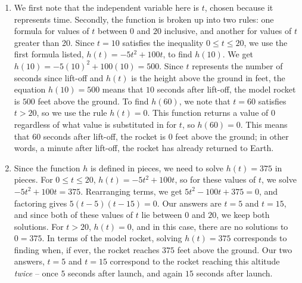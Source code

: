 {
\begin{enumerate} \item We first note that the independent variable here is $t$, chosen because it represents time.  Secondly, the function is broken up into two rules:  one formula for values of $t$ between $0$ and $20$ inclusive, and another for values of $t$ greater than 20. Since $t=10$ satisfies the inequality $0 \leq t \leq 20$,  we use the first formula listed,  $h(t) = -5t^2 + 100t$, to find $h(10)$.  We get $h(10) = -5(10)^2 + 100(10) = 500$.  Since $t$ represents the number of seconds since lift-off and $h(t)$ is the height above the ground in feet, the equation $h(10) = 500$ means that $10$ seconds after lift-off, the model rocket is $500$ feet above the ground. To find $h(60)$, we note that $t=60$ satisfies $t > 20$, so we use the rule $h(t) = 0$.  This function returns a value of $0$ regardless of what value is substituted in for $t$, so $h(60) = 0$.  This means that $60$ seconds after lift-off, the rocket is $0$ feet above the ground;  in other words, a minute after lift-off, the rocket has already returned to Earth.

\item Since the function $h$ is defined in pieces, we need to solve $h(t) = 375$ in pieces.  For $0 \leq t \leq 20$, $h(t) =  -5t^2 + 100t$, so for these values of $t$, we solve $-5t^2 + 100t = 375$.  Rearranging terms, we get $5t^2 - 100t + 375 = 0$, and factoring gives $5(t-5)(t-15) = 0$. Our answers are  $t=5$ and $t=15$, and since both of these values of $t$ lie between $0$ and $20$, we keep both solutions.  For $t>20$, $h(t) = 0$, and in this case, there are no solutions to $0=375$.  In terms of the model rocket,  solving $h(t) = 375$ corresponds to finding when, if ever, the rocket reaches $375$ feet above the ground. Our two answers, $t=5$ and $t=15$ correspond to the rocket reaching this altitude \textit{twice} -- once $5$ seconds after launch, and again $15$ seconds after launch.
\end{enumerate}
}


